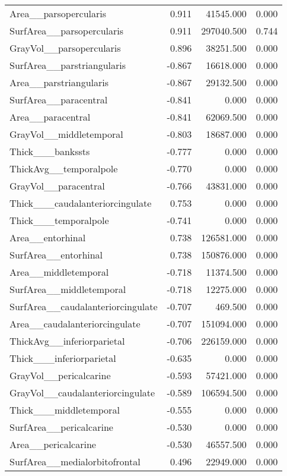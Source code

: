 \documentclass{article}
\begin{document}
\begin{table}
\begin{tabular}{lrrr}
	Area\_\_parsopercularis & 0.911 & 41545.000 & 0.000 \\
	SurfArea\_\_parsopercularis & 0.911 & 297040.500 & 0.744 \\
	GrayVol\_\_parsopercularis & 0.896 & 38251.500 & 0.000 \\
	SurfArea\_\_parstriangularis & -0.867 & 16618.000 & 0.000 \\
	Area\_\_parstriangularis & -0.867 & 29132.500 & 0.000 \\
	SurfArea\_\_paracentral & -0.841 & 0.000 & 0.000 \\
	Area\_\_paracentral & -0.841 & 62069.500 & 0.000 \\
	GrayVol\_\_middletemporal & -0.803 & 18687.000 & 0.000 \\
	Thick\_\_\_bankssts & -0.777 & 0.000 & 0.000 \\
	ThickAvg\_\_temporalpole & -0.770 & 0.000 & 0.000 \\
	GrayVol\_\_paracentral & -0.766 & 43831.000 & 0.000 \\
	Thick\_\_\_caudalanteriorcingulate & 0.753 & 0.000 & 0.000 \\
	Thick\_\_\_temporalpole & -0.741 & 0.000 & 0.000 \\
	Area\_\_entorhinal & 0.738 & 126581.000 & 0.000 \\
	SurfArea\_\_entorhinal & 0.738 & 150876.000 & 0.000 \\
	Area\_\_middletemporal & -0.718 & 11374.500 & 0.000 \\
	SurfArea\_\_middletemporal & -0.718 & 12275.000 & 0.000 \\
	SurfArea\_\_caudalanteriorcingulate & -0.707 & 469.500 & 0.000 \\
	Area\_\_caudalanteriorcingulate & -0.707 & 151094.000 & 0.000 \\
	ThickAvg\_\_inferiorparietal & -0.706 & 226159.000 & 0.000 \\
	Thick\_\_\_inferiorparietal & -0.635 & 0.000 & 0.000 \\
	GrayVol\_\_pericalcarine & -0.593 & 57421.000 & 0.000 \\
	GrayVol\_\_caudalanteriorcingulate & -0.589 & 106594.500 & 0.000 \\
	Thick\_\_\_middletemporal & -0.555 & 0.000 & 0.000 \\
	SurfArea\_\_pericalcarine & -0.530 & 0.000 & 0.000 \\
	Area\_\_pericalcarine & -0.530 & 46557.500 & 0.000 \\
	SurfArea\_\_medialorbitofrontal & 0.496 & 22949.000 & 0.000 \\

\end{tabular}
\end{table}
\end{document}
